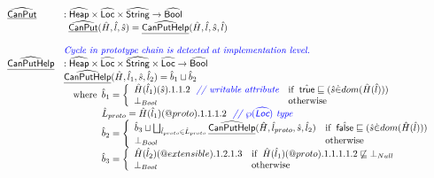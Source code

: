 \[
\begin{array}{ll}
\widehat{\underline{\sf CanPut}} & : \widehat{\mbox{\textsf{Heap}}} \times \widehat{\mbox{\textsf{Loc}}} \times \widehat{\mbox{\textsf{String}}} \rightarrow \widehat{\mbox{\textsf{Bool}}}\\
&
\begin{array}{ll}
  \widehat{\underline{\sf CanPut}}(\hat{H},\hat{l},\hat{s}) = \widehat{\underline{\sf CanPutHelp}}(\hat{H},\hat{l},\hat{s},\hat{l}) & \\
\end{array}
\\\\

& {\color{blue} \textit{Cycle in prototype chain is detected at implementation level.}} \\
\widehat{\underline{\sf CanPutHelp}} &  : \widehat{\mbox{\textsf{Heap}}} \times \widehat{\mbox{\textsf{Loc}}} \times \widehat{\mbox{\textsf{String}}} \times \widehat{\mbox{\textsf{Loc}}} \rightarrow \widehat{\mbox{\textsf{Bool}}}\\
&  \widehat{\underline{\sf CanPutHelp}}(\hat{H},\hat{l}_1,\hat{s},\hat{l}_2)  = \hat{b}_1\sqcup\hat{b}_2\\
&  \quad{\rm where}\begin{array}[t]{l}
    \hat{b}_1 =
    \left\{
      \begin{array}{ll}
        \hat{H}(\hat{l}_1)(\hat{s}).1.1.2
        ~~{\color{blue} \textit{// writable attribute}}
        & {\rm if}\begin{array}[t]{l}\hat{\mbox{\textsf{true}}}\sqsubseteq(\hat{s} \dot{\in} dom(\hat{H}(\hat{l})))\end{array}\\
        \bot_{Bool} & {\rm otherwise}\\
      \end{array}
    \right.\\
    \hat{L}_{proto}=\hat{H}(\hat{l}_1)(@proto).1.1.1.2
~~{\color{blue} \textit{// $\wp(\widehat{\mbox{\textsf{Loc}}})$ type}}\\
    \hat{b}_2 =
    \left\{
      \begin{array}{ll}
        \hat{b}_3 \sqcup \bigsqcup_{\hat{l}_{proto}\in\hat{L}_{proto}}\widehat{\underline{\sf CanPutHelp}}(\hat{H},\hat{l}_{proto},\hat{s},\hat{l}_2)& {\rm if}\begin{array}[t]{l}\hat{\mbox{\textsf{false}}}\sqsubseteq(\hat{s} \dot{\in} dom(\hat{H}(\hat{l})))\end{array}\\
        \bot_{Bool} & {\rm otherwise}\\
      \end{array}
    \right.\\
    \hat{b}_3 =
    \left\{
      \begin{array}{ll}
        \hat{H}(\hat{l}_2)(@extensible).1.2.1.3& {\rm if}\begin{array}[t]{l}\hat{H}(\hat{l}_1)(@proto).1.1.1.1.2 \not\sqsubseteq \bot_{Null}\end{array}\\
        \bot_{Bool} & {\rm otherwise}\\
      \end{array}
    \right.\\
    \end{array}\\
\\


\end{array}\]
